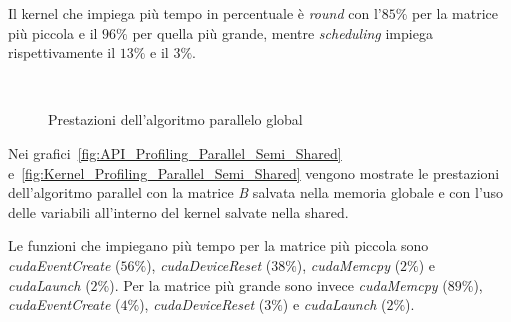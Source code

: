 Il kernel che impiega più tempo in percentuale è \textit{round} con l'$85\%$ per la matrice più piccola e il $96\%$ per quella più grande, mentre \textit{scheduling} impiega rispettivamente il $13\%$ e il $3\%$.

\begin{figure}[H]
	\centering
	 \\
	\caption{Prestazioni dell'algoritmo parallelo global}
\end{figure}

Nei grafici~\ref{fig:API_Profiling_Parallel_Semi_Shared} e~\ref{fig:Kernel_Profiling_Parallel_Semi_Shared} vengono mostrate le prestazioni dell'algoritmo parallel con la matrice \textit{B} salvata nella memoria globale e con l'uso delle variabili all'interno del kernel salvate nella shared.

Le funzioni che impiegano più tempo per la matrice più piccola sono \textit{cudaEventCreate} ($56\%$), \textit{cudaDeviceReset} ($38\%$), \textit{cudaMemcpy} ($2\%$) e \textit{cudaLaunch} ($2\%$). Per la matrice più grande sono invece \textit{cudaMemcpy} ($89\%$), \textit{cudaEventCreate} ($4\%$), \textit{cudaDeviceReset} ($3\%$) e \textit{cudaLaunch} ($2\%$). 

